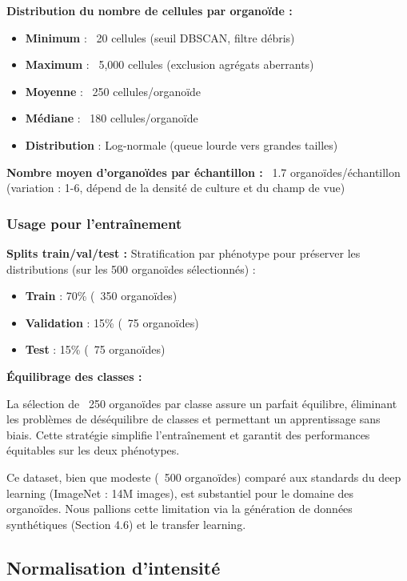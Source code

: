 \textbf{Distribution du nombre de cellules par organoïde :}
\begin{itemize}
    \item \textbf{Minimum} : ~20 cellules (seuil DBSCAN, filtre débris)
    \item \textbf{Maximum} : ~5,000 cellules (exclusion agrégats aberrants)
    \item \textbf{Moyenne} : ~250 cellules/organoïde
    \item \textbf{Médiane} : ~180 cellules/organoïde
    \item \textbf{Distribution} : Log-normale (queue lourde vers grandes tailles)
\end{itemize}

\textbf{Nombre moyen d'organoïdes par échantillon :}
~1.7 organoïdes/échantillon (variation : 1-6, dépend de la densité de culture et du champ de vue)

\subsubsection{Usage pour l'entraînement}

\textbf{Splits train/val/test :}
Stratification par phénotype pour préserver les distributions (sur les 500 organoïdes sélectionnés) :
\begin{itemize}
    \item \textbf{Train} : 70\% (~350 organoïdes)
    \item \textbf{Validation} : 15\% (~75 organoïdes)
    \item \textbf{Test} : 15\% (~75 organoïdes)
\end{itemize}

\textbf{Équilibrage des classes :}

La sélection de ~250 organoïdes par classe assure un parfait équilibre, éliminant les problèmes de déséquilibre de classes et permettant un apprentissage sans biais. Cette stratégie simplifie l'entraînement et garantit des performances équitables sur les deux phénotypes.

Ce dataset, bien que modeste (~500 organoïdes) comparé aux standards du deep learning (ImageNet : 14M images), est substantiel pour le domaine des organoïdes. Nous pallions cette limitation via la génération de données synthétiques (Section 4.6) et le transfer learning.

\subsection{Normalisation d'intensité}

